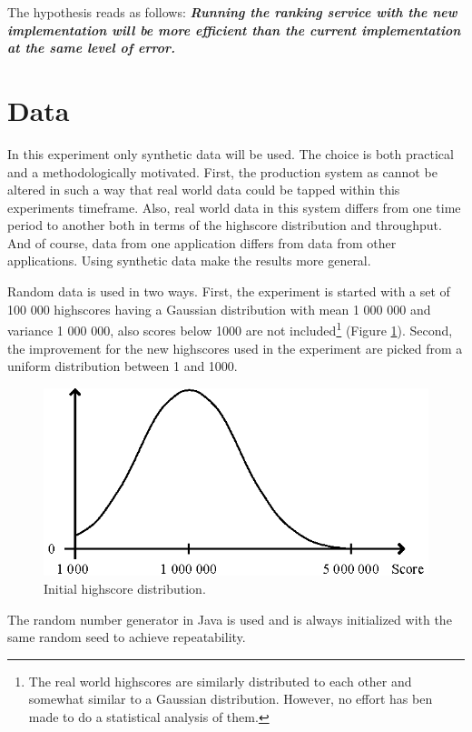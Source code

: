 The hypothesis reads as follows: \emph{\textbf{Running the ranking service with the new implementation will be more efficient than the current implementation at the same level of error.}}

\section{Data}

In this experiment only synthetic data will be used. The choice is both practical and a methodologically motivated. First, the production system as cannot be altered in such a way that real world data could be tapped within this experiments timeframe. Also, real world data in this system differs from one time period to another both in terms of the highscore distribution and throughput. And of course, data from one application differs from data from other applications. Using synthetic data make the results more general.

Random data is used in two ways. First, the experiment is started with a set of 100 000 highscores having a Gaussian distribution with mean 1 000 000 and variance 1 000 000, also scores below 1000 are not included\footnote{The real world highscores are similarly distributed to each other and somewhat similar to a Gaussian distribution. However, no effort has ben made to do a statistical analysis of them.} (Figure \ref{fig:highscore-distribution}). Second, the improvement for the new highscores used in the experiment are picked from a uniform distribution between 1 and 1000.
 
\begin{figure}[h]
  \centering
  \caption{Initial highscore distribution.}
  \label{fig:highscore-distribution}
  \includegraphics[width=13cm]{img/highscore-distribution.eps}
\end{figure} 

The random number generator in Java is used and is always initialized with the same random seed to achieve repeatability.  

